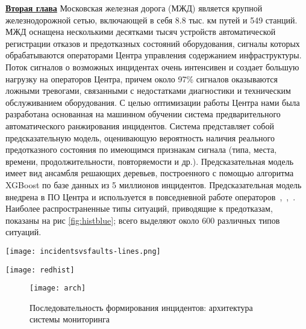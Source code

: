 
\underline{\textbf{Вторая глава}}
Московская железная дорога (МЖД) является крупной железнодорожной сетью, включающей в себя 8.8 тыс. км путей и 549 станций. МЖД оснащена несколькими десятками тысяч устройств автоматической регистрации отказов и предотказных состояний оборудования, сигналы которых обрабатываются операторами Центра управления содержанием инфраструктуры. Поток сигналов о возможных инцидентах очень интенсивен и создает большую нагрузку на операторов Центра, причем около 97\% сигналов оказываются ложными тревогами, связанными с недостатками диагностики и техническим обслуживанием оборудования. С целью оптимизации работы Центра нами была разработана основанная на машинном обучении система предварительного автоматического ранжирования инцидентов. Система представляет собой предсказательную модель, оценивающую вероятность наличия реального предотказного состояния по имеющимся признакам сигнала (типа, места, времени,  продолжительности, повторяемости и др.). Предсказательная модель имеет вид ансамбля решающих деревьев, построенного с помощью алгоритма XGBoost по базе данных из 5 миллионов инцидентов. Предсказательная модель внедрена в ПО Центра и используется в повседневной работе операторов~\cite{bulletin-rzd},~\cite{itivs-2017},~\cite{icmla-2017}. Наиболее распространенные типы ситуаций, приводящие к предотказам, показаны на рис \ref{fig:histblue}; всего выделяют около 600 различных типов ситуаций.

\begin{figure*}
\centering
\texttt{[image: incidentsvsfaults-lines.png]}
\caption{Наиболее распространённые типы ситуаций, приводящих к предотказу}
\centering
\label{fig:histblue}
\end{figure*}

\begin{figure*}[t]
\centering
\texttt{[image: redhist]}
\caption{Наиболее распространённые типы ситуаций устройств телемеханики, приводящие к предотказу}
\centering
\label{fig:histred}
\end{figure*}

\begin{figure}[t]
\centering
\texttt{[image: arch]}
\caption{Последовательность формирования инцидентов: архитектура системы мониторинга}
\centering
\label{fig:arch}
\end{figure}
